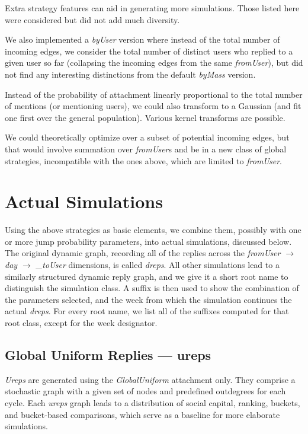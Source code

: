 \documentclass[10pt,oneside]{memoir}
\begin{document}
\label{sec:extra-strategy-features}
Extra strategy features can aid in generating more simulations.  Those listed here were considered but did not add much diversity.


We also implemented a {\itshape byUser} version where instead of the total number of incoming edges, we consider the total number of distinct users who replied to a given user so far (collapsing the incoming edges from the same \emph{fromUser}), but did not find any interesting distinctions from the default \emph{byMass} version.


Instead of the probability of attachment linearly proportional to the total number of mentions (or mentioning users), we could also transform to a Gaussian (and fit one first over the general population).  Various kernel transforms are possible.


We could theoretically optimize over a subset of potential incoming edges, but that would involve summation over \emph{fromUser}s and be in a new class of global strategies, incompatible with the ones above, which are limited to {\itshape fromUser}.


\pagebreak \section{Actual Simulations}
\label{actualsimulations}

Using the above strategies as basic elements, we combine them, possibly with one or more jump probability parameters, into actual simulations, discussed below.  The original dynamic graph, recording all of the replies across the {\itshape fromUser $\rightarrow$ day $\rightarrow$ \_toUser} dimensions, is called {\itshape dreps}.  All other simulations lead to a similarly structured dynamic reply graph, and we give it a short root name to distinguish the simulation class.  A suffix is then used to show the combination of the parameters selected, and the week from which the simulation continues the actual {\itshape dreps}.  For every root name, we list all of the suffixes computed for that root class, except for the week designator.


\subsection{Global Uniform Replies --- ureps}
\label{globaluniformrepliesureps}

{\itshape Ureps} are generated using the {\itshape GlobalUniform} attachment only.  They comprise a stochastic graph with a given set of nodes and predefined outdegrees for each cycle.  Each {\itshape ureps} graph leads to a distribution of social capital, ranking, buckets, and bucket-based comparisons, which serve as a baseline for more elaborate simulations.
\end{document}
